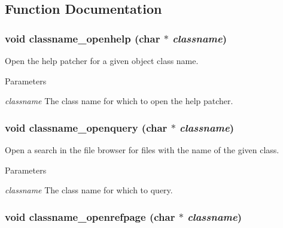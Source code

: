 \subsection{Function Documentation}
\hypertarget{group__obj_ga5de96f9ed649a42b2133d21c38e3476b}{
\subsubsection[{classname\_\-openhelp}]{\setlength{\rightskip}{0pt plus 5cm}void classname\_\-openhelp (char $\ast$ {\em classname})}}
\label{group__obj_ga5de96f9ed649a42b2133d21c38e3476b}


Open the help patcher for a given object class name. 
\begin{DoxyParams}{Parameters}
\item[{\em classname}]The class name for which to open the help patcher. \end{DoxyParams}
\hypertarget{group__obj_ga24a3ab7c91801d4b0ae377d15adfc117}{
\subsubsection[{classname\_\-openquery}]{\setlength{\rightskip}{0pt plus 5cm}void classname\_\-openquery (char $\ast$ {\em classname})}}
\label{group__obj_ga24a3ab7c91801d4b0ae377d15adfc117}


Open a search in the file browser for files with the name of the given class. 
\begin{DoxyParams}{Parameters}
\item[{\em classname}]The class name for which to query. \end{DoxyParams}
\hypertarget{group__obj_ga8e08b5bc9657c1800ee8a452e9d14d3d}{
\subsubsection[{classname\_\-openrefpage}]{\setlength{\rightskip}{0pt plus 5cm}void classname\_\-openrefpage (char $\ast$ {\em classname})}}
\label{group__obj_ga8e08b5bc9657c1800ee8a452e9d14d3d}


